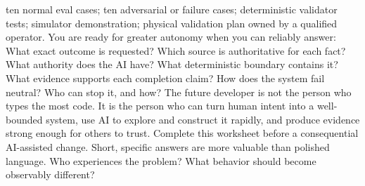 \markdownRendererUlItem ten normal eval cases;\markdownRendererUlItemEnd 
\markdownRendererUlItem ten adversarial or failure cases;\markdownRendererUlItemEnd 
\markdownRendererUlItem deterministic validator tests;\markdownRendererUlItemEnd 
\markdownRendererUlItem simulator demonstration;\markdownRendererUlItemEnd 
\markdownRendererUlItem physical validation plan owned by a qualified operator.\markdownRendererUlItemEnd 
\markdownRendererUlEnd \markdownRendererInterblockSeparator
{}
\markdownRendererSectionEnd \markdownRendererSectionBegin
{}\markdownRendererInterblockSeparator
{}You are ready for greater autonomy when you can reliably answer:\markdownRendererInterblockSeparator
{}\markdownRendererOlBegin
{}What exact outcome is requested?\markdownRendererOlItemEnd 
{}Which source is authoritative for each fact?\markdownRendererOlItemEnd 
{}What authority does the AI have?\markdownRendererOlItemEnd 
{}What deterministic boundary contains it?\markdownRendererOlItemEnd 
{}What evidence supports each completion claim?\markdownRendererOlItemEnd 
{}How does the system fail neutral?\markdownRendererOlItemEnd 
{}Who can stop it, and how?\markdownRendererOlItemEnd 
\markdownRendererOlEnd \markdownRendererInterblockSeparator
{}The future developer is not the person who types the most code. It is the\markdownRendererSoftLineBreak
{}person who can turn human intent into a well-bounded system, use AI to explore\markdownRendererSoftLineBreak
{}and construct it rapidly, and produce evidence strong enough for others to\markdownRendererSoftLineBreak
{}trust.\markdownRendererInterblockSeparator
{}\markdownRendererThematicBreak{}\markdownRendererInterblockSeparator
{}
\markdownRendererSectionEnd 
\markdownRendererSectionEnd \markdownRendererSectionBegin
{}\markdownRendererInterblockSeparator
{}Complete this worksheet before a consequential AI-assisted change. Short,\markdownRendererSoftLineBreak
{}specific answers are more valuable than polished language.\markdownRendererInterblockSeparator
{}\markdownRendererSectionBegin
{}\markdownRendererInterblockSeparator
{}\markdownRendererUlBegin
\markdownRendererUlItem Who experiences the problem?\markdownRendererUlItemEnd 
\markdownRendererUlItem What behavior should become observably different?\markdownRendererUlItemEnd 
